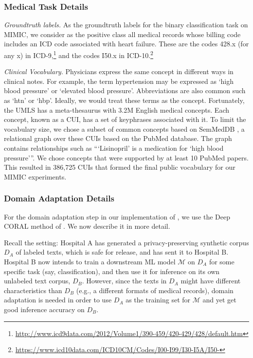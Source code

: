 \subsubsection{Medical Task Details}\label{app:mimic}
\noindent\textit{Groundtruth labels.}
As the groundtruth labels for the binary classification task on MIMIC, we consider as the positive class all medical records whose billing code includes an ICD code associated with heart failure. These are the codes 428.x (for any x) in ICD-9,\footnote{\url{http://www.icd9data.com/2012/Volume1/390-459/420-429/428/default.htm}}
and the codes I50.x in ICD-10.\footnote{\url{https://www.icd10data.com/ICD10CM/Codes/I00-I99/I30-I5A/I50-}}

\noindent\textit{Clinical Vocabulary.}
Physicians express the same concept in different ways in clinical notes. For example, the term hypertension may be expressed as ‘high blood pressure’ or ‘elevated blood pressure’. Abbreviations are also common such as ‘htn’ or ‘hbp’. Ideally, we would treat these terms as the concept. Fortunately, the UMLS has a meta-thesaurus with 3.2M English medical concepts. Each concept, known as a CUI, has a set of keyphrases associated with it.
%
To limit the vocabulary size, we chose a subset of common concepts based on SemMedDB \cite{kilicoglu2012semmeddb}, a relational graph over these CUIs based on the PubMed database. The graph contains relationships such as ``‘Lisinopril’ is a medication for ‘high blood pressure’''. We chose concepts that were supported by at least 10 PubMed papers. This resulted in 386,725 CUIs that formed the final public vocabulary for our MIMIC experiments. 


\subsubsection{Domain Adaptation Details}\label{sec:deep_coral_details}
For the domain adaptation step in our implementation of \alg, we use the Deep CORAL method of \cite{sun2016deep}. We now describe it in more detail. 

Recall the setting: Hospital A has generated a privacy-preserving synthetic corpus $D_A$ of labeled texts, which is safe for release, and has sent it to Hospital B. Hospital B now intends to train a downstream ML model $\mathcal{M}$ on $D_A$ for some specific task (say, classification), and then use it for inference on its own unlabeled text corpus, $D_B$. However, since the texts in $D_A$ might have different characteristics than $D_B$ (e.g., a different formats of medical records), domain adaptation is needed in order to use $D_A$ as the training set for $\mathcal{M}$ and yet get good inference accuracy on $D_B$. 

